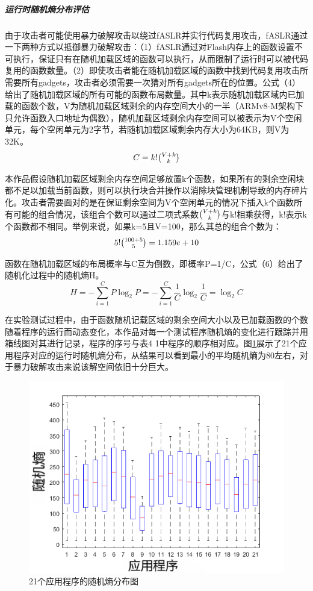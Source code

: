 \documentclass[12pt,a4paper]{ctexart}
\numberwithin{figure}{section}
\begin{document}
\subparagraph{运行时随机熵分布评估}
\par 由于攻击者可能使用暴力破解攻击以绕过fASLR并实行代码复用攻击，fASLR通过一下两种方式以抵御暴力破解攻击：（1）fASLR通过对Flash内存上的函数设置不可执行，保证只有在随机加载区域的函数可以执行，从而限制了运行时可以被代码复用的函数数量。（2）即使攻击者能在随机加载区域的函数中找到代码复用攻击所需要所有gadgets，攻击者必须需要一次猜对所有gadgets所在的位置。公式（4）给出了随机加载区域的所有可能的函数布局数量。其中k表示随机加载区域内已加载的函数个数，V为随机加载区域剩余的内存空间大小的一半（ARMv8-M架构下只允许函数入口地址为偶数），随机加载区域剩余内存空间可以被表示为V个空闲单元，每个空闲单元为2字节，若随机加载区域剩余内存大小为64KB，则V为32K。
\begin{equation}
    C = k!\tbinom{V+k}{k}
\end{equation}
\par 本作品假设随机加载区域剩余内存空间足够放置k个函数，如果所有的剩余空闲块都不足以加载当前函数，则可以执行块合并操作以消除块管理机制导致的内存碎片化。攻击者需要面对的是在保证剩余空间为V个空闲单元的情况下插入k个函数所有可能的组合情况，该组合个数可以通过二项式系数$\tbinom{V+k}{k}$与k!相乘获得，k!表示k个函数都不相同。举例来说，如果k=5且V=100，那么其总的组合个数为：
\begin{equation}
    5!\tbinom{100+5}{5}=1.159e+10
\end{equation}
\par 函数在随机加载区域的布局概率与C互为倒数，即概率P=1/C，公式（6）给出了随机化过程中的随机熵H。
\begin{equation}
    H=-\sum_{i=1}^C P\log_2 P = -\sum_{i=1}^{C} \frac{1}{C}\log_2 \frac{1}{C} = \log_2 C
\end{equation}
\par 在实验测试过程中，由于函数随机记载区域的剩余空间大小以及已加载函数的个数随着程序的运行而动态变化，本作品对每一个测试程序随机熵的变化进行跟踪并用箱线图对其进行记录，程序的序号与表4 1中程序的顺序相对应。图\ref{randomEntropy}展示了21个应用程序对应的运行时随机熵分布，从结果可以看到最小的平均随机熵为80左右，对于暴力破解攻击来说该解空间依旧十分巨大。
\begin{figure}[H]
    \label{randomEntropy}
    \centering
    \includegraphics[scale=0.7]{graph/randomEntropy.png}
    \caption{21个应用程序的随机熵分布图}
\end{figure}
\end{document}

